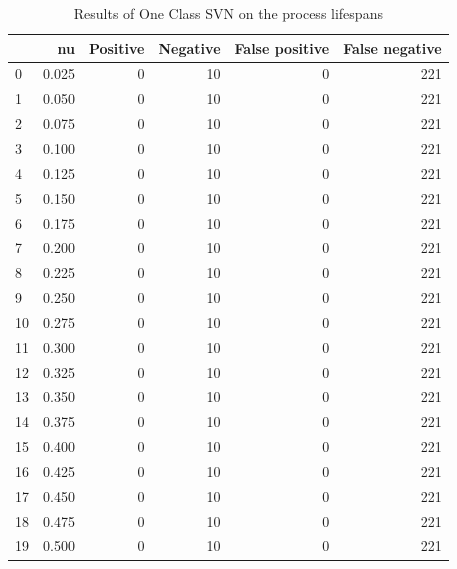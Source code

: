 \documentclass[a4paper,twoside,12pt]{book}
\begin{document}
\begin{table}
	\centering
	\caption{Results of One Class SVN on the process lifespans}
	\label{id:tab:OCSVNlifespans}
	\begin{tabular}{lrrrrr}
		\toprule
		{} &     nu &  Positive &  Negative &  False positive &  False negative \\
		\midrule
		0  &  0.025 &         0 &        10 &               0 &             221 \\
		1  &  0.050 &         0 &        10 &               0 &             221 \\
		2  &  0.075 &         0 &        10 &               0 &             221 \\
		3  &  0.100 &         0 &        10 &               0 &             221 \\
		4  &  0.125 &         0 &        10 &               0 &             221 \\
		5  &  0.150 &         0 &        10 &               0 &             221 \\
		6  &  0.175 &         0 &        10 &               0 &             221 \\
		7  &  0.200 &         0 &        10 &               0 &             221 \\
		8  &  0.225 &         0 &        10 &               0 &             221 \\
		9  &  0.250 &         0 &        10 &               0 &             221 \\
		10 &  0.275 &         0 &        10 &               0 &             221 \\
		11 &  0.300 &         0 &        10 &               0 &             221 \\
		12 &  0.325 &         0 &        10 &               0 &             221 \\
		13 &  0.350 &         0 &        10 &               0 &             221 \\
		14 &  0.375 &         0 &        10 &               0 &             221 \\
		15 &  0.400 &         0 &        10 &               0 &             221 \\
		16 &  0.425 &         0 &        10 &               0 &             221 \\
		17 &  0.450 &         0 &        10 &               0 &             221 \\
		18 &  0.475 &         0 &        10 &               0 &             221 \\
		19 &  0.500 &         0 &        10 &               0 &             221 \\

\end{tabular}
\end{table}
\end{document}
